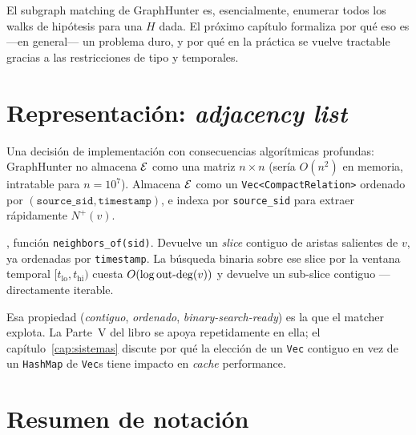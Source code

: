 El subgraph matching de GraphHunter es, esencialmente, enumerar
todos los walks de hipótesis para una \(H\) dada. El próximo
capítulo formaliza por qué eso es ---en general--- un problema duro,
y por qué en la práctica se vuelve tractable gracias a las
restricciones de tipo y temporales.

\section{Representación: \emph{adjacency list}}

Una decisión de implementación con consecuencias algorítmicas
profundas: GraphHunter no almacena \(\mathcal{E}\) como una matriz \(n \times
n\) (sería \(O(n^2)\) en memoria, intratable para \(n = 10^7\)).
Almacena \(\mathcal{E}\) como un \texttt{Vec<CompactRelation>} ordenado por
\((\texttt{source\_sid}, \texttt{timestamp})\), e indexa por
\texttt{source\_sid} para extraer rápidamente \(N^{+}(v)\).

\begin{enelcodigo}
, función
\texttt{neighbors\_of(sid)}. Devuelve un \emph{slice} contiguo de
aristas salientes de \(v\), ya ordenadas por \texttt{timestamp}.
La búsqueda binaria sobre ese slice por la ventana temporal
\([t_{\mathrm{lo}}, t_{\mathrm{hi}})\) cuesta \(O(\log \mathrm{out\text{-}deg}(v))\)
y devuelve un sub-slice contiguo ---directamente iterable.
\end{enelcodigo}

Esa propiedad (\emph{contiguo}, \emph{ordenado},
\emph{binary-search-ready}) es la que el matcher explota. La Parte~V
del libro se apoya repetidamente en ella; el capítulo~\ref{cap:sistemas}
discute por qué la elección de un \texttt{Vec} contiguo en vez de un
\texttt{HashMap} de \texttt{Vec}s tiene impacto en \emph{cache}
performance.

\section{Resumen de notación}

